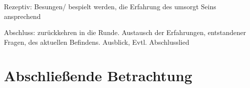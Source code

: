 Rezeptiv: 
Besungen/ bespielt werden, die Erfahrung des umsorgt Seins ansprechend

Abschluss: 
zurückkehren in die Runde. Austausch der Erfahrungen, entstandener Fragen, des aktuellen Befindens. Ausblick, Evtl. Abschlusslied


\section{Abschließende Betrachtung}





\ifpdf
    \graphicspath{{5_konzept/figures/PNG/}{5_konzept/figures/PDF/}{5_konzept/figures/}}
\else
    \graphicspath{{5_konzept/figures/EPS/}{5_konzept/figures/}}
\fi

\newpage\thispagestyle{empty}
